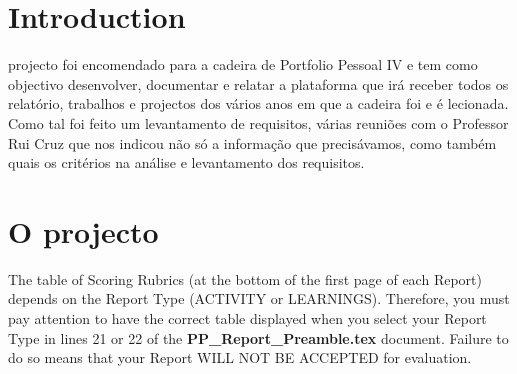 \documentclass[a4paper,12pt,journal,twoside,compsoc]{PPIEEEtran}
\begin{document}

\maketitle

\IEEEdisplaynontitleabstractindextext
\IEEEpeerreviewmaketitle
\section{Introduction}
% 
% 
 projecto foi encomendado para a cadeira de Portfolio Pessoal IV e tem como objectivo desenvolver, documentar e relatar a plataforma que irá receber todos os relatório, trabalhos e projectos dos vários anos em que a cadeira foi e é lecionada. Como tal foi feito um levantamento de requisitos, várias reuniões com o Professor Rui Cruz que nos indicou não só a informação que precisávamos, como também quais os critérios na análise e levantamento dos requisitos.

\section{O projecto}
The table of Scoring Rubrics (at the bottom of the first page of each Report) depends on the Report Type (ACTIVITY or LEARNINGS). Therefore, you must pay attention to have the correct table displayed when you select your Report Type in lines 21 or 22 of the \textbf{PP\_Report\_Preamble.tex} document. Failure to do so means that your Report WILL NOT BE ACCEPTED for evaluation.
\end{document}
